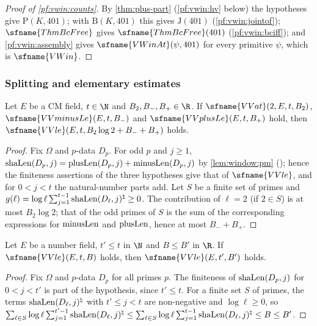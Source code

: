 \begin{proof}[Proof of \cref{pf:vwin:counts}]
By \cref{thm:plus-part} (\cref{pf:vwin:hv} below) the hypotheses give $\mathrm{P}(K,401)$; with $\mathrm{B}(K,401)$
this gives $\mathrm{J}(401)$ (\cref{pf:vwin:jointof}); $\sfname{ThmBcFree}$ gives $\sfname{ThmBcFree}(401)$
(\cref{pf:vwin:bciff}); and \cref{pf:vwin:assembly} gives $\sfname{VWinAt}(\psi,401)$ for every primitive $\psi$, which
is $\sfname{VWin}$.
\end{proof}

\subsubsection{Splitting and elementary estimates}

\begin{lemma}\label{pf:vwin:parts}
Let $E$ be a CM field, $t\in\N$ and $B_2,B_-,B_+\in\R$. If $\sfname{VVat}(2,E,t,B_2)$, $\sfname{VVminusLe}(E,t,B_-)$ and
$\sfname{VVplusLe}(E,t,B_+)$ hold, then $\sfname{VVle}(E,t,B_2\log2+B_-+B_+)$ holds.
\end{lemma}

\begin{proof}
Fix $\Omega$ and $p$-data $D_p$. For odd $p$ and $j\ge1$, $\mathrm{shaLen}(D_p,j)=\mathrm{plusLen}(D_p,j)+\mathrm{minusLen}(D_p,j)$ by
\cref{lem:window:pm} (); hence the finiteness assertions of the three hypotheses
give that of $\sfname{VVle}$, and for $0<j<t$ the natural-number parts add. Let $S$ be a finite set of primes and
$g(\ell)=\log\ell\sum_{j=1}^{t-1}\mathrm{shaLen}(D_\ell,j)^\natural\ge0$. The contribution of $\ell=2$ (if $2\in S$) is at most
$B_2\log 2$; that of the odd primes of $S$ is the sum of the corresponding expressions for $\mathrm{minusLen}$ and $\mathrm{plusLen}$, hence
at most $B_-+B_+$.
\end{proof}

\begin{lemma}[Monotonicity]\label{pf:vwin:vvlemono}
Let $E$ be a number field, $t'\le t$ in $\N$ and $B\le B'$ in $\R$. If $\sfname{VVle}(E,t,B)$ holds, then
$\sfname{VVle}(E,t',B')$ holds.
\end{lemma}

\begin{proof}
Fix $\Omega$ and $p$-data $D_p$ for all primes $p$. The finiteness of $\mathrm{shaLen}(D_p,j)$ for $0<j<t'$ is part of the
hypothesis, since $t'\le t$. For a finite set $S$ of primes, the terms $\mathrm{shaLen}(D_\ell,j)^\natural$ with $t'\le j<t$ are
non-negative and $\log\ell\ge0$, so
$\sum_{\ell\in S}\log\ell\sum_{j=1}^{t'-1}\mathrm{shaLen}(D_\ell,j)^\natural\le\sum_{\ell\in S}\log\ell\sum_{j=1}^{t-1}
\mathrm{shaLen}(D_\ell,j)^\natural\le B\le B'$.
\end{proof}

